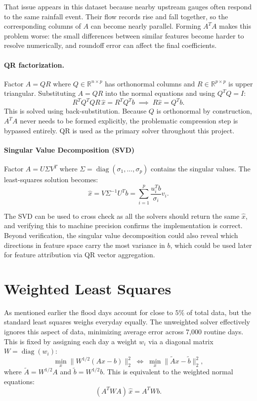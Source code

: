 \documentclass[10pt, twocolumn]{article}
\begin{document}
That issue appears in this dataset because nearby upstream gauges often respond to the same rainfall event. Their flow records rise and fall together, so the corresponding columns of \(A\) can become nearly parallel. Forming \(A^T A\) makes this problem worse: the small differences between similar features become harder to resolve numerically, and roundoff error can affect the final coefficients.

\paragraph{QR factorization.}
Factor $A = QR$ where $Q \in \mathbb{R}^{n \times p}$ has orthonormal columns and
$R \in \mathbb{R}^{p \times p}$ is upper triangular. Substituting $A = QR$ into the
normal equations and using $Q^TQ = I$:
\[
  R^T Q^T Q R\, \hat{x} = R^T Q^T b \;\implies\; R\hat{x} = Q^T b.
\]
This is solved using back-substitution. Because $Q$ is orthonormal by construction,
$A^TA$ never needs to be formed explicitly, the problematic compression step is bypassed
entirely. QR is used as the primary solver throughout this project.

\paragraph{Singular Value Decomposition (SVD)}
Factor $A = U \Sigma V^T$ where $\Sigma = \operatorname{diag}(\sigma_1, \ldots, \sigma_p)$
contains the singular values. The least-squares solution becomes:
\[
  \hat{x} = V \Sigma^{-1} U^T b = \sum_{i=1}^{p} \frac{u_i^T b}{\sigma_i} v_i.
\]

The SVD can be used to cross check as all the solvers should return the same $\hat{x}$, and verifying this to machine precision confirms the implementation is correct. Beyond verification, the singular value decomposition could also reveal which directions
in feature space carry the most variance in $b$, which could be used later for feature attribution via QR vector aggregation.

\section{Weighted Least Squares}
As mentioned earlier the flood days account for close to $5\%$ of total data, but the standard least squares weighs everyday equally. The unweighted solver effectively ignores this aspect of data, minimizing average error across 7,000 routine days.
This is fixed by assigning each day a weight $w_i$ via a diagonal matrix $W = \operatorname{diag}(w_i)$:
\[
  \min_x \|W^{1/2}(Ax - b)\|_2^2 \;\Longleftrightarrow\; \min_x \|\tilde{A}x - \tilde{b}\|_2^2,
\]
where $\tilde{A} = W^{1/2}A$ and $\tilde{b} = W^{1/2}b$.
This is equivalent to the weighted normal equations:
\[
  (A^T W A)\,\hat{x} = A^T W b.
\]
\end{document}
